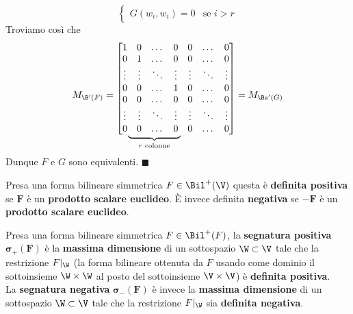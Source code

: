 \documentclass[11pt, a4paper, titlepage, oneside]{scrbook}
\begin{document}
\begin{enumerate}[label=\arabic*°]
\[\begin{cases}
    G(w_i, w_i) = 0 & \text{se } i > r 
    \end{cases}
    \]
    Troviamo così che
    \[
    M_{\B'(F)} = \begin{array}{@{}c@{}}
    \begin{bmatrix}
        1 & 0 & \dots & 0 & 0 & \dots & 0 \\
        0 & 1 & \dots & 0 & 0 & \dots & 0 \\
        \vdots & \vdots & \ddots & \vdots & \vdots & \ddots & \vdots \\
        0 & 0 & \dots & 1 & 0 & \dots & 0 \\
        0 & 0 & \dots & 0 & 0 & \dots & 0 \\
        \vdots & \vdots & \ddots & \vdots & \vdots & \ddots & \vdots \\
        0 & 0 & \dots & 0 & 0 & \dots & 0 
    \end{bmatrix} \\[-2ex]
    \begin{array}{@{}cc@{}}
        \underbrace{\rule{5.5em}{0pt}}_{r \text{ colonne}} & \rule{3.5em}{0pt}
    \end{array}
\end{array}
= M_{\Bs'(G)}
    \]
    Dunque $F$ e $G$ sono equivalenti. $\blacksquare$
\end{enumerate}

\begin{Definizione}
\label{def-forma-definita-positiva-negativa}
Presa una forma bilineare simmetrica $F \in \Bil^+(\V)$ questa è \textbf{definita positiva} se $\bm{F}$ è un \textbf{prodotto scalare euclideo}. È invece definita \textbf{negativa} se $\bm{-F}$ è un \textbf{prodotto scalare euclideo}.
\end{Definizione}

\begin{Definizione}
\label{def-segnatura-positiva}
Presa una forma bilineare simmetrica $F \in \Bil^+(F)$, la \textbf{segnatura positiva} $\bm{\sigma_+(F)}$ è la \textbf{massima dimensione} di un sottospazio $\W \subset \V$ tale che la restrizione $F|_\W$ (la forma bilineare ottenuta da $F$ usando come dominio il sottoinsieme $\W \times \W$ al posto del sottoinsieme $\V \times \V$) è \textbf{definita positiva}. \\
La \textbf{segnatura negativa} $\bm{\sigma_-(F)}$ è invece la \textbf{massima dimensione} di un sottospazio $\W \subset \V$ tale che la restrizione  $F|_\W$ sia \textbf{definita negativa}.
\end{Definizione}
\end{document}
